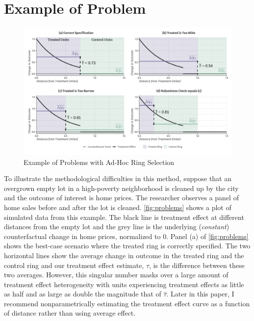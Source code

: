\section{Example of Problem}\label{sec:example}


\begin{figure}[tb]
  \caption{Example of Problems with Ad-Hoc Ring Selection}
  \label{fig:problems}
  \includegraphics[width=\textwidth]{figures/geocoded/example.pdf}

\end{figure}

To illustrate the methodological difficulties in this method, suppose that an overgrown empty lot in a high-poverty neighborhood is cleaned up by the city and the outcome of interest is home prices. The researcher observes a panel of home sales before and after the lot is cleaned. \autoref{fig:problems} shows a plot of simulated data from this example. The black line is treatment effect at different distances from the empty lot and the grey line is the underlying (\textit{constant}) counterfactual change in home prices, normalized to 0. Panel (a) of \autoref{fig:problems} shows the best-case scenario where the treated ring is correctly specified. The two horizontal lines show the average change in outcome in the treated ring and the control ring and our treatment effect estimate, $\hat{\tau}$, is the difference between these two averages. However, this singular number masks over a large amount of treatment effect heterogeneity with units experiencing treatment effects as little as half and as large as double the magnitude that of $\hat{\tau}$. Later in this paper, I recommend nonparametrically estimating the treatment effect curve as a function of distance rather than using average effect. 

